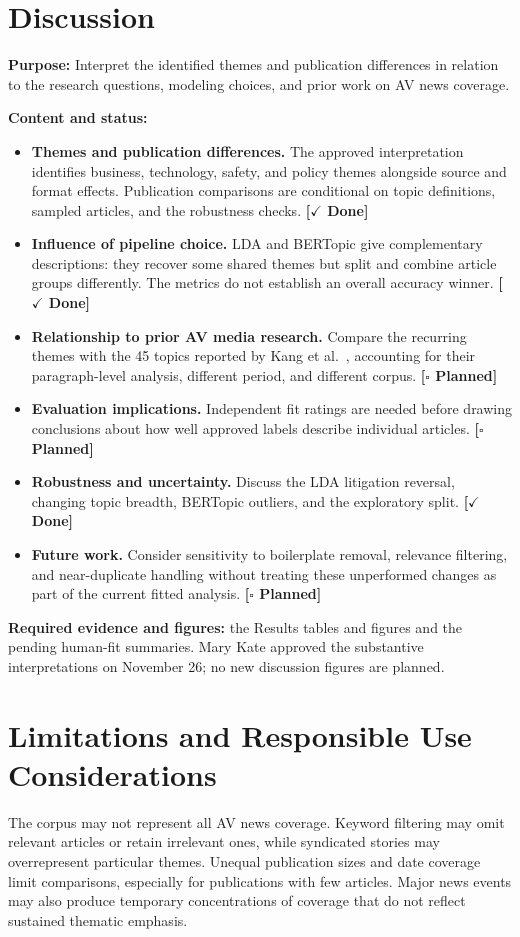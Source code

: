 \documentclass[conference]{IEEEtran}
\newcommand{\done}{\textcolor{green!40!black}{\textbf{[$\checkmark$ Done]}}}
\newcommand{\planned}{\textcolor{blue!60!black}{\textbf{[$\square$ Planned]}}}
\begin{document}
\section*{Discussion}
\textbf{Purpose:} Interpret the identified themes and publication differences in relation to the research questions, modeling choices, and prior work on AV news coverage.

\textbf{Content and status:}
\begin{itemize}
    \item \textbf{Themes and publication differences.} The approved interpretation identifies business, technology, safety, and policy themes alongside source and format effects. Publication comparisons are conditional on topic definitions, sampled articles, and the robustness checks. \done
    \item \textbf{Influence of pipeline choice.} LDA and BERTopic give complementary descriptions: they recover some shared themes but split and combine article groups differently. The metrics do not establish an overall accuracy winner. \done
    \item \textbf{Relationship to prior AV media research.} Compare the recurring themes with the 45 topics reported by Kang et al.~\cite{kang2025unveiling}, accounting for their paragraph-level analysis, different period, and different corpus. \planned
    \item \textbf{Evaluation implications.} Independent fit ratings are needed before drawing conclusions about how well approved labels describe individual articles. \planned
    \item \textbf{Robustness and uncertainty.} Discuss the LDA litigation reversal, changing topic breadth, BERTopic outliers, and the exploratory split. \done
    \item \textbf{Future work.} Consider sensitivity to boilerplate removal, relevance filtering, and near-duplicate handling without treating these unperformed changes as part of the current fitted analysis. \planned
\end{itemize}

\textbf{Required evidence and figures:} the Results tables and figures and the pending human-fit summaries. Mary Kate approved the substantive interpretations on November 26; no new discussion figures are planned.

\section*{Limitations and Responsible Use Considerations}
The corpus may not represent all AV news coverage. Keyword filtering may omit relevant articles or retain irrelevant ones, while syndicated stories may overrepresent particular themes. Unequal publication sizes and date coverage limit comparisons, especially for publications with few articles. Major news events may also produce temporary concentrations of coverage that do not reflect sustained thematic emphasis.
\end{document}
